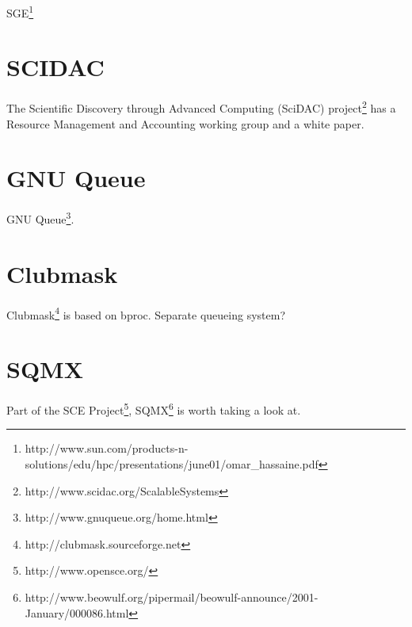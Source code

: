 \documentclass{article}
\begin{document}
SGE\footnote{http://www.sun.com/products-n-solutions/edu/hpc/presentations/june01/omar\_hassaine.pdf}


\section{SCIDAC}

The Scientific Discovery through Advanced Computing (SciDAC) 
project\footnote{http://www.scidac.org/ScalableSystems}
has a Resource Management and Accounting working group
and a white paper\cite{Res2000}.

\section{GNU Queue}

GNU Queue\footnote{http://www.gnuqueue.org/home.html}.

\section{Clubmask}
Clubmask\footnote{http://clubmask.sourceforge.net} is based on bproc.
Separate queueing system?

\section{SQMX}
Part of the SCE Project\footnote{http://www.opensce.org/}, 
SQMX\footnote{http://www.beowulf.org/pipermail/beowulf-announce/2001-January/000086.html} is worth taking a look at.
                                                                                
\newpage


\end{document}
